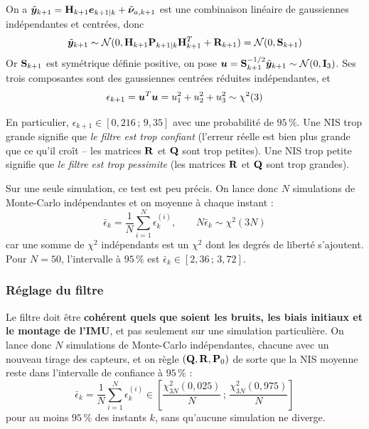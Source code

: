  On a $\tilde{\bm{y}}_{k+1} = \mathbf{H}_{k+1}\bm{e}_{k+1|k} + \tilde{\bm{\nu}}_{a,k+1}$ est une combinaison linéaire de gaussiennes indépendantes et centrées, donc
\[
    \tilde{\bm{y}}_{k+1} \sim \mathcal{N}(0, \mathbf{H}_{k+1}\mathbf{P}_{k+1|k}\mathbf{H}_{k+1}^T + \mathbf{R}_{k+1}) = \mathcal{N}(0, \mathbf{S}_{k+1})
\]
Or $\mathbf{S}_{k+1}$ est symétrique définie positive, on pose $\bm{u} = \mathbf{S}_{k+1}^{-1/2}\tilde{\bm{y}}_{k+1} \sim \mathcal{N}(0, \mathbf{I}_3)$. Ses trois composantes sont des gaussiennes centrées réduites indépendantes, et
\[
        \epsilon_{k+1} = \bm{u}^T\bm{u} = u_1^2 + u_2^2 + u_3^2 \sim \chi^2(3)
\]

En particulier, $\epsilon_{k+1} \in [0{,}216 \,;\, 9{,}35]$ avec une probabilité de $95\,\%$. Une NIS trop grande signifie que \emph{le filtre est trop confiant} (l'erreur réelle est bien plus grande que ce qu'il croît -- les matrices $\mathbf{R}$ et $\mathbf{Q}$ sont trop petites). Une NIS trop petite signifie que \emph{le filtre est trop pessimite} (les matrices $\mathbf{R}$ et $\mathbf{Q}$ sont trop grandes).

Sur une seule simulation, ce test est peu précis. On lance donc $N$ simulations de Monte-Carlo indépendantes et on moyenne à chaque instant :
\[
    \bar{\epsilon}_{k} = \frac{1}{N}\sum_{i=1}^{N}\epsilon_{k}^{(i)}, \qquad N\bar{\epsilon}_{k} \sim \chi^2(3N)
\]
car une somme de $\chi^2$ indépendants est un $\chi^2$ dont les degrés de liberté s'ajoutent. Pour $N = 50$, l'intervalle à $95\,\%$ est $\bar{\epsilon}_{k} \in [2{,}36 \,;\, 3{,}72]$.
\subsubsection{Réglage du filtre}
\begin{proposition}
    Le filtre doit être \textbf{cohérent quels que soient les bruits, les biais initiaux et le montage de l'IMU}, et pas seulement sur une simulation particulière. On lance donc $N$ simulations de Monte-Carlo indépendantes, chacune avec un nouveau tirage des capteurs, et on règle $(\mathbf{Q}, \mathbf{R}, \mathbf{P}_0)$ de sorte que la NIS moyenne reste dans l'intervalle de confiance à $95\,\%$ :
    \[
        \bar{\epsilon}_k = \frac{1}{N}\sum_{i=1}^{N}\epsilon_k^{(i)} \in \left[\frac{\chi^2_{3N}(0{,}025)}{N} \,;\, \frac{\chi^2_{3N}(0{,}975)}{N}\right]
    \]
    pour au moins $95\,\%$ des instants $k$, sans qu'aucune simulation ne diverge.
\end{proposition}
